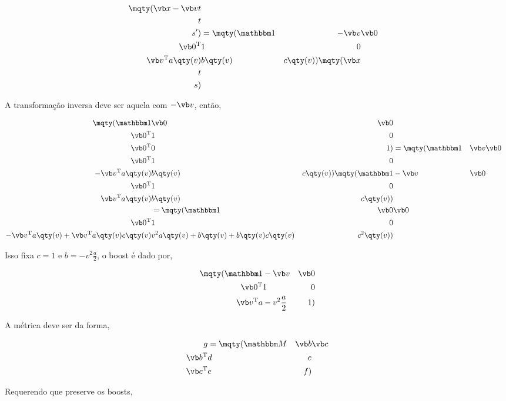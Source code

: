 \documentclass[twoside]{amsart}
\numberwithin{equation}{section}
\begin{document}
\begin{refsection}
\begin{align}
    \mqty(\vb x-\vb v t\\t\\ s')&=\mqty(\mathbbm 1&-\vb v&\vb 0\\ \vb 0^{\textup T }&1&0\\\vb v^{\textup T}a\qty(v)&b\qty(v)&c\qty(v))\mqty(\vb x\\ t\\ s)
\end{align}

A transformação inversa deve ser aquela com $-\vb v$, então,

\begin{align}
    \mqty(\mathbbm 1&\vb 0&\vb 0\\\vb 0^{\textup T}&1&0\\\vb 0^{\textup T}&0&1)&=\mqty(\mathbbm 1&\vb v&\vb 0\\ \vb 0^{\textup T }&1&0\\-\vb v^{\textup T}a\qty(v)&b\qty(v)&c\qty(v))\mqty(\mathbbm 1&-\vb v&\vb 0\\ \vb 0^{\textup T }&1&0\\\vb v^{\textup T}a\qty(v)&b\qty(v)&c\qty(v))\\
    &=\mqty(\mathbbm 1&\vb 0&\vb 0\\ \vb 0^{\textup T }&1&0\\-\vb v^{\textup T}a\qty(v)+\vb v^{\textup T}a\qty(v)c\qty(v)&v^2a\qty(v)+b\qty(v)+b\qty(v)c\qty(v)&c^2\qty(v))
\end{align}

Isso fixa $c=1$ e $b=-v^2\frac a2$, o boost é dado por,

\begin{align}
    \mqty(\mathbbm 1&-\vb v&\vb 0\\ \vb 0^{\textup T }&1&0\\\vb v^{\textup T}a&-v^2\frac a2&1)
\end{align}

A métrica deve ser da forma,

\begin{align}
    g&=\mqty(\mathbbm M&\vb b&\vb c\\\vb b^{\textup T}&d&e\\\vb c^{\textup T}&e&f)
\end{align}

Requerendo que preserve os boosts,


\end{refsection}
\end{document}

